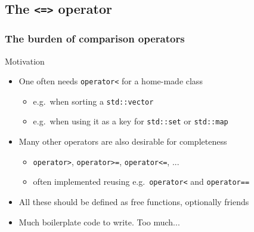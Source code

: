 \subsection[spaceship]{The \texttt{<=>} operator}

\begin{frame}[fragile]
  \frametitle{The burden of comparison operators}
  \begin{block}{Motivation}
    \begin{itemize}
    \item One often needs \texttt{operator<} for a home-made class
      \begin{itemize}
      \item e.g.\ when sorting a \texttt{std::vector}
      \item e.g.\ when using it as a key for \texttt{std::set} or \texttt{std::map}
      \end{itemize}
    \item Many other operators are also desirable for completeness
      \begin{itemize}
      \item \texttt{operator>}, \texttt{operator>=}, \texttt{operator<=}, ...
      \item often implemented reusing e.g.\ \texttt{operator<} and \texttt{operator==}
      \end{itemize}
    \item All these should be defined as free functions, optionally friends
    \item Much boilerplate code to write. Too much...
    \end{itemize}
  \end{block}
\end{frame}

